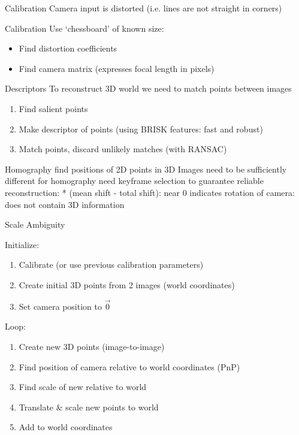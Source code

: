 \documentclass{beamer}
\begin{document}
\begin{frame}{Calibration}
	Camera input is distorted (i.e. lines are not straight in corners)

\end{frame}

\begin{frame}{Calibration}
	Use `chessboard' of known size:
	\begin{itemize}
		\item Find distortion coefficients
		\item Find camera matrix (expresses focal length in pixels)
	\end{itemize}

\end{frame}

\begin{frame}{Descriptors}
	To reconstruct 3D world we need to match points between images
	\begin{enumerate}
		\item Find salient points
		\item Make descriptor of points (using BRISK features: fast and robust)
		\item Match points, discard unlikely matches (with RANSAC)
	\end{enumerate}
\end{frame}

\begin{frame}{Homography}
	find positions of 2D points in 3D
	Images need to be sufficiently different for homography
	need keyframe selection to guarantee reliable reconstruction:
	* (mean shift - total shift):
	  near 0 indicates rotation of camera: does not contain 3D information
\end{frame}

\begin{frame}{Scale Ambiguity}
	
\end{frame}

\begin{frame}
	Initialize:
	\begin{enumerate}
		\item Calibrate (or use previous calibration parameters)
		\item Create initial 3D points from 2 images (world coordinates)
		\item Set camera position to $\vec{0}$
			\setcounter{enumTemp}{\theenumi}
	\end{enumerate}
	Loop:
	\begin{enumerate}
			 \setcounter{enumi}{\theenumTemp}
		\item Create new 3D points (image-to-image)
		\item Find position of camera relative to world coordinates (PnP)
		\item Find scale of new relative to world
		\item Translate \& scale new points to world
		\item Add to world coordinates
	\end{enumerate}
\end{frame}






\end{document}
